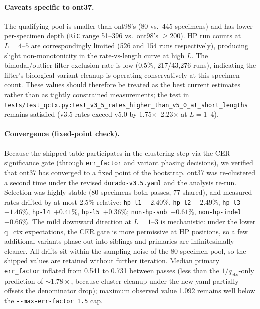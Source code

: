 \documentclass[11pt]{article}
\begin{document}
\paragraph{Caveats specific to ont37.} The qualifying pool is smaller than
ont98's (80 vs.\ 445 specimens) and has lower per-specimen depth
(\texttt{RiC} range 51--396 vs.\ ont98's $\geq 200$). HP run counts at
$L=4$--$5$ are correspondingly limited (526 and 154 runs respectively),
producing slight non-monotonicity in the rate-vs-length curve at high $L$.
The bimodal/outlier filter exclusion rate is low (0.5\%, 217/43,276 runs),
indicating the filter's biological-variant cleanup is operating
conservatively at this specimen count. These values should therefore be
treated as the best current estimates rather than as tightly constrained
measurements; the test in
\texttt{tests/test\_qctx.py:test\_v3\_5\_rates\_higher\_than\_v5\_0\_at\_short\_lengths}
remains satisfied (v3.5 rates exceed v5.0 by 1.75$\times$--2.23$\times$ at
$L=1$--$4$).

\paragraph{Convergence (fixed-point check).} Because the shipped table
participates in the clustering step via the CER significance gate
(through \texttt{err\_factor} and variant phasing decisions), we verified
that ont37 has converged to a fixed point of the bootstrap. ont37 was
re-clustered a second time under the revised \texttt{dorado-v3.5.yaml}
and the analysis re-run. Selection was highly stable (80 specimens both
passes, 77 shared), and measured rates drifted by at most 2.5\%
relative: \texttt{hp-l1}~$-2.40\%$, \texttt{hp-l2}~$-2.49\%$,
\texttt{hp-l3}~$-1.46\%$, \texttt{hp-l4}~$+0.41\%$, \texttt{hp-l5}~$+0.36\%$;
\texttt{non-hp-sub}~$-0.61\%$, \texttt{non-hp-indel}~$-0.66\%$. The mild
downward direction at $L=1$--$3$ is mechanistic: under the lower q\_ctx
expectations, the CER gate is more permissive at HP positions, so a few
additional variants phase out into siblings and primaries are
infinitesimally cleaner. All drifts sit within the sampling noise of the
80-specimen pool, so the shipped values are retained without further
iteration. Median primary \texttt{err\_factor} inflated from 0.541 to
0.731 between passes (less than the $1/q_\text{ctx}$-only prediction of
$\sim 1.78\times$, because cluster cleanup under the new yaml partially
offsets the denominator drop); maximum observed value 1.092 remains well
below the \texttt{-{}-max-err-factor~1.5} cap.
\end{document}
